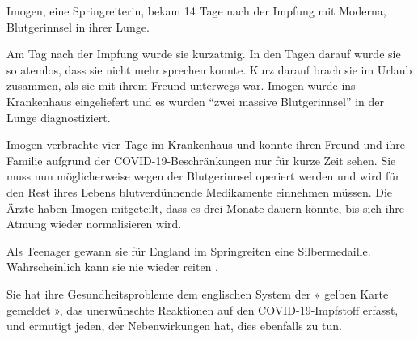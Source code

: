 Imogen, eine Springreiterin, bekam 14 Tage nach der Impfung mit Moderna,
Blutgerinnsel in ihrer Lunge.

Am Tag nach der Impfung wurde sie kurzatmig. In den Tagen darauf wurde sie so
atemlos, dass sie nicht mehr sprechen konnte. Kurz darauf brach sie im Urlaub
zusammen, als sie mit ihrem Freund unterwegs war. Imogen wurde ins Krankenhaus
eingeliefert und es wurden “zwei massive Blutgerinnsel” in der Lunge
diagnostiziert.

Imogen verbrachte vier Tage im Krankenhaus und konnte ihren Freund und ihre
Familie aufgrund der COVID-19-Beschränkungen nur für kurze Zeit sehen. Sie muss
nun möglicherweise wegen der Blutgerinnsel operiert werden und wird für den Rest
ihres Lebens blutverdünnende Medikamente einnehmen müssen. Die Ärzte haben
Imogen mitgeteilt, dass es drei Monate dauern könnte, bis sich ihre Atmung
wieder normalisieren wird.

Als Teenager gewann sie für England im Springreiten eine
Silbermedaille. Wahrscheinlich kann sie nie wieder reiten .

Sie hat ihre Gesundheitsprobleme dem englischen System der « gelben Karte
gemeldet », das unerwünschte Reaktionen auf den COVID-19-Impfstoff erfasst, und
ermutigt jeden, der Nebenwirkungen hat, dies ebenfalls zu tun.

